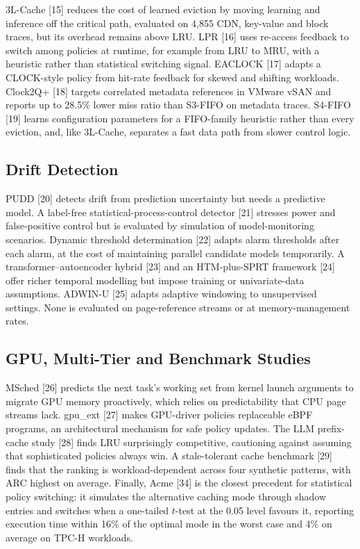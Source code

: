 \documentclass[10pt,twocolumn,a4paper]{IEEEtran}
\begin{document}
3L-Cache [15] reduces the cost of learned eviction by moving learning and
inference off the critical path, evaluated on 4,855 CDN, key-value and block
traces, but its overhead remains above LRU. LPR [16] uses re-access feedback to
switch among policies at runtime, for example from LRU to MRU, with a
heuristic rather than statistical switching signal. EACLOCK [17] adapts a
CLOCK-style policy from hit-rate feedback for skewed and shifting workloads.
Clock2Q+ [18] targets correlated metadata references in VMware vSAN and reports
up to 28.5\% lower miss ratio than S3-FIFO on metadata traces. S4-FIFO [19]
learns configuration parameters for a FIFO-family heuristic rather than every
eviction, and, like 3L-Cache, separates a fast data path from slower control
logic.

\subsection{Drift Detection}

PUDD [20] detects drift from prediction uncertainty but needs a predictive
model. A label-free statistical-process-control detector [21] stresses power
and false-positive control but is evaluated by simulation of model-monitoring
scenarios. Dynamic threshold determination [22] adapts alarm thresholds after
each alarm, at the cost of maintaining parallel candidate models temporarily.
A transformer--autoencoder hybrid [23] and an HTM-plus-SPRT framework [24]
offer richer temporal modelling but impose training or univariate-data
assumptions. ADWIN-U [25] adapts adaptive windowing to unsupervised settings.
None is evaluated on page-reference streams or at memory-management rates.

\subsection{GPU, Multi-Tier and Benchmark Studies}

MSched [26] predicts the next task's working set from kernel launch arguments
to migrate GPU memory proactively, which relies on predictability that CPU page
streams lack. gpu\_ext [27] makes GPU-driver policies replaceable eBPF
programs, an architectural mechanism for safe policy updates. The LLM
prefix-cache study [28] finds LRU surprisingly competitive, cautioning against
assuming that sophisticated policies always win. A stale-tolerant cache
benchmark [29] finds that the ranking is workload-dependent across four
synthetic patterns, with ARC highest on average. Finally, Acme [34] is the closest precedent for statistical policy
switching: it simulates the alternative caching mode through shadow entries and
switches when a one-tailed $t$-test at the 0.05 level favours it, reporting
execution time within 16\% of the optimal mode in the worst case and 4\% on
average on TPC-H workloads.
\end{document}
